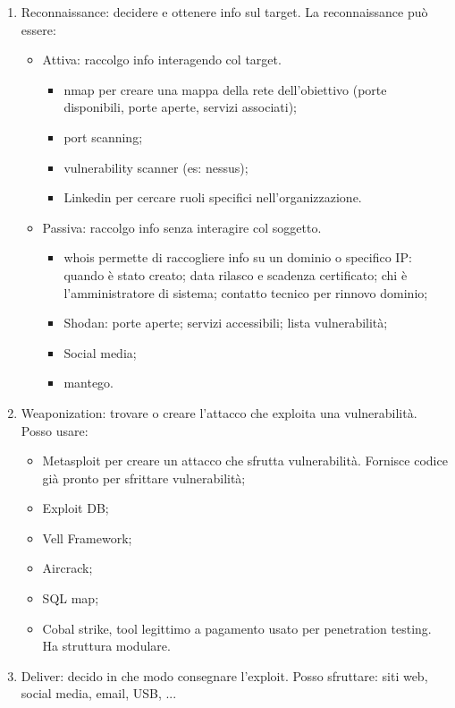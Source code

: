 \begin{enumerate}
    \item Reconnaissance: decidere e ottenere info sul target. La reconnaissance può essere:
\begin{itemize}
    \item Attiva: raccolgo info interagendo col target.
        \begin{itemize}
            \item nmap per creare una mappa della rete dell'obiettivo (porte disponibili, porte aperte, servizi associati); 
	        \item port scanning;
	          \item vulnerability scanner (es: nessus);
	        \item Linkedin per cercare ruoli specifici nell'organizzazione.
        \end{itemize}
    \item Passiva: raccolgo info senza interagire col soggetto.
	      \begin{itemize}
	          \item whois permette di raccogliere info su un dominio o specifico IP: quando è stato creato; data rilasco e scadenza certificato; chi è l'amministratore di sistema; contatto tecnico per rinnovo dominio;
	          \item Shodan: porte aperte; servizi accessibili; lista vulnerabilità;
	        \item Social media;
	        \item mantego.
	      \end{itemize}
\end{itemize}

	
\item Weaponization: trovare o creare l'attacco che exploita una vulnerabilità. Posso usare:
\begin{itemize}
    \item Metasploit per creare un attacco che sfrutta vulnerabilità. Fornisce codice già pronto per sfrittare vulnerabilità;
    \item Exploit DB;
    \item Vell Framework;
    \item Aircrack;
    \item SQL map;
    \item Cobal strike, tool legittimo a pagamento usato per penetration testing. Ha struttura modulare.
\end{itemize} 

\item Deliver: decido in che modo consegnare l'exploit. Posso sfruttare: siti web, social media, email, USB, ...


\end{enumerate}
